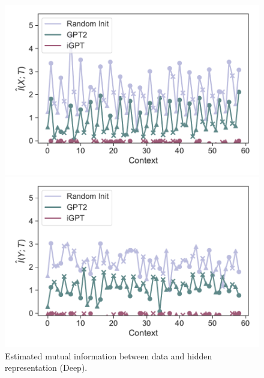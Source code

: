 \documentclass{article}
\begin{document}
\begin{figure}[H]
    \centering
    \begin{minipage}[b]{0.45\linewidth}
    \includegraphics[width=\linewidth]{figs/mi_x_11.mlp.dropout_40_gpt2_igpt_dt_hopper_medium_666.pdf}
    \end{minipage}
    \begin{minipage}[b]{0.45\linewidth}
    \includegraphics[width=\linewidth]{figs/mi_y_11.mlp.dropout_40_gpt2_igpt_dt_hopper_medium_666.pdf}
    \end{minipage}
    \caption{Estimated mutual information between data and hidden representation (Deep).}
    \label{fig:mutual_information_context_deep}
\end{figure}
\end{document}
